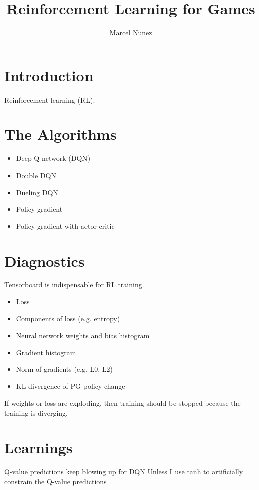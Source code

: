 \documentclass[12pt]{article}
\title{Reinforcement Learning for Games}
\author{Marcel Nunez}
\begin{document}
	\maketitle
	
	\section{Introduction}
	
	Reinforcement learning (RL).
	
	\section{The Algorithms}
	
	\begin{itemize}
		\item Deep Q-network (DQN)
		\item Double DQN
		\item Dueling DQN
		\item Policy gradient
		\item Policy gradient with actor critic
	\end{itemize}
	
	\section{Diagnostics}
	
	Tensorboard is indispensable for RL training.
	
	\begin{itemize}
		\item Loss
		\item Components of loss (e.g. entropy)
		\item Neural network weights and bias histogram
		\item Gradient histogram
		\item Norm of gradients (e.g. L0, L2)
		\item KL divergence of PG policy change
	\end{itemize}
	
	If weights or loss are exploding, then training
	should be stopped because the training is diverging.
	
	\section{Learnings}
	
	Q-value predictions keep blowing up for DQN
	Unless I use tanh to artificially constrain the Q-value predictions
	
\end{document}
